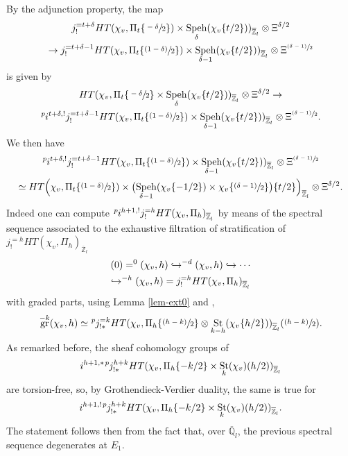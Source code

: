 \documentclass[JEP,XML,SOM,Unicode,published]{cedram}
\newcommand{\NoChangel}[1]{%
\expandafter\let\csname old\string#1\endcsname=#1
\let#1=\relax
\newcommand{#1}{\mathcode`l="716C\csname old\string#1\endcsname\mathcode`l="7160 }%
}
\def\hto{\mathrel{\lhook\joinrel\to}}
\newcommand{\psfrac}[2]{\sfrac{(#1)}{#2}}
\theoremstyle{plain}
\theoremstyle{definition}
\numberwithin{equation}{subsection}
\newcommand\Qm{{\mathbb Q}}
\newcommand\Zm{{\mathbb Z}}
\newcommand{\lexp}[2]{\kern \scriptspace \vphantom{#2}^{#1}\kern-\scriptspace#2}
\DeclareMathOperator{\speh}{Speh}
\DeclareMathOperator{\st}{St}
\DeclareMathOperator{\gr}{gr}
\DeclareMathOperator{\Fil}{Fil}\NoChangel{\Fil}
\begin{document}
By the adjunction property, the map
\begin{multline} \label{eq-map1}
j_!^{=t+\delta} HT(\chi_{v},\Pi_t \{\sfrac{-\delta}{2}\}) \times \speh_{\delta}
(\chi_{v}\{t/2\}))_{\overline \Zm_l} \otimes \Xi^{\delta/2} \\
\to j_!^{=t+\delta-1} HT(\chi_{v},\Pi_t \{\psfrac{1-\delta}{2}\}) \times
\speh_{\delta-1}(\chi_{v}\{t/2\}))_{\overline \Zm_l} \otimes \Xi^{\psfrac{\delta-1}{2}}
\end{multline}
is given by
\begin{multline}\label{eq-map2}
HT(\chi_{v},\Pi_t \{\sfrac{-\delta}{2}\} \times \speh_{\delta}(\chi_{v}\{t/2\}))_{\overline \Zm_l}
\otimes \Xi^{\delta/2} \to \\
\lexp p i^{t+\delta,!} j_!^{=t+\delta-1} HT(\chi_{v},\Pi_t \{\psfrac{1-\delta}{2}\}) \times
\speh_{\delta-1}(\chi_{v}\{t/2\}))_{\overline \Zm_l} \otimes \Xi^{\psfrac{\delta-1}{2}}.
\end{multline}
We then have
\begin{multline} \label{eq-map3}
\lexp p i^{t+\delta,!} j_!^{=t+\delta-1} HT(\chi_{v},\Pi_t \{\psfrac{1-\delta}{2}\}) \times
\speh_{\delta-1}(\chi_{v}\{t/2\}))_{\overline \Zm_l} \otimes \Xi^{\psfrac{\delta-1}{2}} \\ \simeq
HT \Bigl (\chi_{v}, \Pi_t \{\psfrac{1-\delta}{2}\}) \times \bigl (\speh_{\delta-1}(\chi_{v} \{-1/2\})
\times \chi_{v} \{\psfrac{\delta-1}{2}\} \bigr) \{t/2\} \Bigr)_{\overline \Zm_l} \otimes \Xi^{\delta/2}.
\end{multline}
Indeed one can compute $\lexp p i^{h+1,!} j_{!}^{=h} HT(\chi_v,\Pi_h)_{\overline \Zm_l}$ by means of
the spectral sequence associated to the exhaustive filtration of stratification of
$j_{!}^{=h} HT(\chi_v,\Pi_h)_{\overline \Zm_l}$
\begin{multline} \label{eq-filj}
(0)=\Fil^0(\chi_{v},h) \hto \Fil^{-d}(\chi_{v},h) \hto \cdots
\\
\hto \Fil^{-h}(\chi_{v},h)=j^{=h}_{!} HT(\chi_{v},\Pi_h)_{\overline \Zm_l}
\end{multline}
with graded parts, using Lemma \ref{lem-ext0} and \cite{boyer-torsion},
\[
\gr^{-k}(\chi_{v},h) \simeq \lexp p j^{=k}_{!*}
HT(\chi_{v},\Pi_h \{\psfrac{h-k}{2}\} \otimes \st_{k-h}(\chi_{v}\{h/2\}))_{\overline \Zm_l}(\psfrac{h-k}{2}).
\]
As remarked before, the sheaf cohomology groups of
\[
i^{h+1,*} \lexp p j_{!*}^{h+k} HT(\chi_v,\Pi_h \{-k/2\} \times \st_k(\chi_v)(h/2))_{\overline \Zm_l}
\]
are torsion-free, so, by Grothendieck-Verdier duality, the same is true for
\[
i^{h+1,!} \lexp p j_{!*}^{h+k} HT(\chi_v,\Pi_h \{-k/2\}\times \st_k(\chi_v)(h/2))_{\overline \Zm_l}.
\]
The statement follows then from the fact that, over
$\overline \Qm_l$, the previous spectral sequence degenerates at $E_1$.
\end{document}
